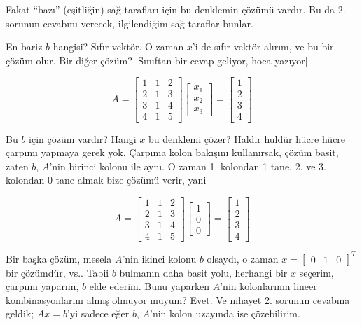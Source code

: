 \documentclass[12pt,fleqn]{article}\usepackage{../../common}
\begin{document}
Fakat ``bazı'' (eşitliğin) sağ tarafları için bu denklemin çözümü
vardır. Bu da 2. sorunun cevabını verecek, ilgilendiğim sağ taraflar
bunlar. 

En bariz $b$ hangisi? Sıfır vektör. O zaman $x$'i de sıfır vektör alırım,
ve bu bir çözüm olur. Bir diğer çözüm? [Sınıftan bir cevap geliyor, hoca
yazıyor]


$$ A = 
\left[\begin{array}{rrr}
1 & 1 & 2 \\
2 & 1 & 3 \\
3 & 1 & 4 \\
4 & 1 & 5 
\end{array}\right]
\left[\begin{array}{r}
x_1  \\
x_2  \\
x_3  
\end{array}\right] 
=
\left[\begin{array}{r}
1  \\
2  \\
3  \\
4  
\end{array}\right]
 $$

Bu $b$ için çözüm vardır? Hangi $x$ bu denklemi çözer? Haldir huldür hücre
hücre çarpımı yapmaya gerek yok. Çarpıma kolon bakışını kullanırsak, çözüm
basit, zaten $b$, $A$'nin birinci kolonu ile aynı. O zaman 1. kolondan 1
tane, 2. ve 3. kolondan 0 tane almak bize çözümü verir, yani

$$ A = 
\left[\begin{array}{rrr}
1 & 1 & 2 \\
2 & 1 & 3 \\
3 & 1 & 4 \\
4 & 1 & 5 
\end{array}\right]
\left[\begin{array}{r}
1  \\
0  \\
0  
\end{array}\right] 
=
\left[\begin{array}{r}
1  \\
2  \\
3  \\
4  
\end{array}\right]
 $$


Bir başka çözüm, mesela $A$'nin ikinci kolonu $b$ olsaydı, o zaman 
$x = \left[\begin{array}{rrr} 0 & 1 & 0 \end{array}\right]^T$ bir çözümdür,
vs.. Tabii $b$ bulmanın daha basit yolu, herhangi bir $x$ seçerim, çarpımı
yaparım, $b$ elde ederim. Bunu yaparken $A$'nin kolonlarının lineer
kombinasyonlarını almış olmuyor muyum? Evet. Ve nihayet 2. sorunun cevabına 
geldik; $Ax=b$'yi sadece eğer $b$, $A$'nin kolon uzayında ise çözebilirim. 
\end{document}
